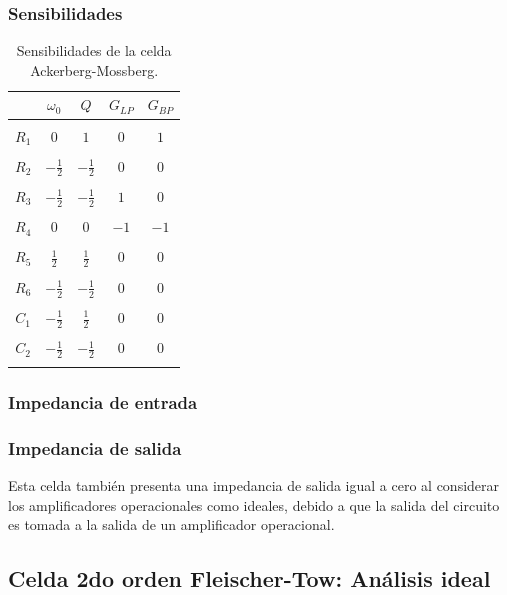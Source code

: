 \subsubsection{Sensibilidades}

\begin{table}[H]
	\centering
	\begin{tabular}{c c c c c }
		& $\omega_0$ & $Q$ &$G_{LP}$ & $G_{BP}$\\
		\hline \\
		$R_1$ & $0$ & $1$ & $0$ & $1$\\ \\
		$R_2$ & $-\frac{1}{2}$ & $-\frac{1}{2}$ & $0$ & $0$\\ \\
		$R_3$ & $-\frac{1}{2}$ & $-\frac{1}{2}$ & $1$ & $0$ \\ \\
		$R_4$ & $0$ & $0$ & $-1$ & $-1$ \\ \\
		$R_5$ & $\frac{1}{2}$ & $\frac{1}{2}$ & $0$ & $0$ \\ \\
		$R_6$ & $-\frac{1}{2}$ & $-\frac{1}{2}$ & $0$ & $0$ \\ \\
		$C_1$ & $-\frac{1}{2} $ & $\frac{1}{2}$ & $0$ & $0$\\ \\
		$C_2$ & $-\frac{1}{2}$ & $-\frac{1}{2}$ & $0$ & $0$\\ \\
		\hline
	\end{tabular}
	\caption{Sensibilidades de la celda Ackerberg-Mossberg.}
	\label{sens_am}
\end{table}

\subsubsection{Impedancia de entrada}

\subsubsection{Impedancia de salida}
Esta celda tambi\'en presenta una impedancia de salida igual a cero al considerar los amplificadores operacionales como ideales, debido a que la salida del circuito es tomada a la salida de un amplificador operacional.

\subsection{Celda 2do orden Fleischer-Tow: An\'alisis ideal}

